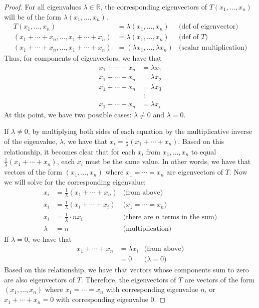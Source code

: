 \documentclass[12pt,reqno]{article}
\newcommand{\R}{\mathbb{R}}
\theoremstyle{definition}
\begin{document}
\begin{proof}
    For all eigenvalues $\lambda\in\R$, the corresponding eigenvectors of $T(x_1,\ldots,x_n)$ will be of the form $\lambda(x_1,\ldots,x_n)$.
    \begin{align*}
        T(x_1,\ldots,x_n) &= \lambda(x_1,\ldots,x_n) & \text{(def of eigenvector)}\\
        (x_1 + \cdots + x_n, \ldots, x_1 + \cdots + x_n) &= \lambda(x_1,\ldots,x_n) & \text{(def of $T$)}\\
        (x_1 + \cdots + x_n, \ldots, x_1 + \cdots + x_n) &= (\lambda x_1,\ldots,\lambda x_n) & \text{(scalar multiplication)}
    \end{align*}
    Thus, for components of eigenvectors, we have that
    \begin{align*}
        x_1 + \cdots + x_n &= \lambda x_1\\
        x_1 + \cdots + x_n &= \lambda x_2\\
        x_1 + \cdots + x_n &= \lambda x_3\\
        &\ \,\vdots\\
        x_1 + \cdots + x_n &= \lambda x_i
    \end{align*}
    At this point, we have two possible cases: $\lambda \neq 0$ and $\lambda = 0$.
    
    If $\lambda\neq 0$, by multiplying both sides of each equation by the multiplicative inverse of the eigenvalue, $\lambda$, we have that $x_i = \frac{1}{\lambda}(x_1 + \cdots + x_n)$. Based on this relationship, it becomes clear that for each $x_i$ from $x_1,\ldots,x_n$ to equal $\frac{1}{\lambda}(x_1 + \cdots + x_n)$, each $x_i$ must be the same value. In other words, we have that vectors of the form $(x_1, \ldots, x_n)$ where $x_1 = \cdots = x_n$ are eigenvectors of $T$. Now we will solve for the corresponding eigenvalue:
    \begin{align*}
        x_i &= \frac{1}{\lambda}(x_1 + \cdots + x_n) & \text{(from above)}\\
        x_i &= \frac{1}{\lambda}(x_i + \cdots + x_i) & \text{($x_1 = \cdots = x_n$)}\\
        x_i &= \frac{1}{\lambda} \cdot nx_i & \text{(there are $n$ terms in the sum)}\\
        \lambda &= n & \text{(multiplication)}
    \end{align*}
    If $\lambda = 0$, we have that
    \begin{align*}
        x_1+\cdots+x_n &= \lambda x_i & \text{(from above)}\\
        &= 0 & \text{($\lambda = 0$)}
    \end{align*}
    Based on this relationship, we have that vectors whose components sum to zero are also eigenvectors of $T$. Therefore, the eigenvectors of $T$ are vectors of the form $(x_1, \ldots, x_n)$ where $x_1=\cdots =x_n$ with corresponding eigenvalue $n$, or $x_1+\cdots+x_n=0$ with corresponding eigenvalue $0$.
\end{proof}
\end{document}
